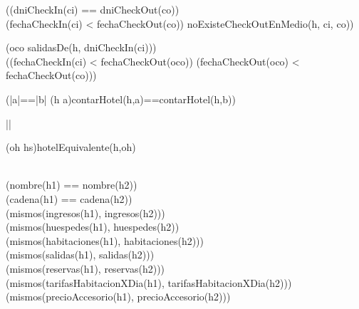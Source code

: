 {
}

\vspace{0.2cm}

{
    ((dniCheckIn(ci) == dniCheckOut(co)) \land
    \\(fechaCheckIn(ci) < fechaCheckOut(co)) \land noExisteCheckOutEnMedio(h, ci, co))
}

\vspace{0.2cm}

{
	\lnot(\exists oco \selec salidasDe(h, dniCheckIn(ci)))\\
	((fechaCheckIn(ci) < fechaCheckOut(oco)) \land (fechaCheckOut(oco) < fechaCheckOut(co)))
}

\vspace{0.2cm}

{
	(|a|==|b| \land (\forall h \selec a)contarHotel(h,a)==contarHotel(h,b))
}

\vspace{0.2cm}

{
	||
}

\vspace{0.2cm}

{
	(\exists oh \selec hs)hotelEquivalente(h,oh)
}

\vspace{0.2cm}

{
	\\ (nombre(h1) == nombre(h2)) \land \\
	(cadena(h1) == cadena(h2)) \land \\
	(mismos(ingresos(h1), ingresos(h2))) \land \\
	(mismos(huespedes(h1), huespedes(h2)) \land \\
	(mismos(habitaciones(h1), habitaciones(h2))) \land \\
	(mismos(salidas(h1), salidas(h2))) \land \\
	(mismos(reservas(h1), reservas(h2))) \land \\
	(mismos(tarifasHabitacionXDia(h1), tarifasHabitacionXDia(h2))) \land \\
	(mismos(precioAccesorio(h1), precioAccesorio(h2)))
}

